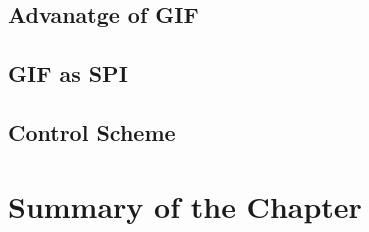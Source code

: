 \subsection{Advanatge of GIF}
\subsection{GIF as SPI}
\subsection{Control Scheme}



\section{Summary of the Chapter}

